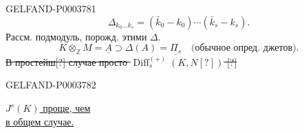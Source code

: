 \begin{GelfandAdjacentEvidence}{GELFAND-P000378}{1}
\begin{equation*}\Delta_{k_0\ldots k_s}=(\bar k_0-k_0)\cdots(\bar k_s-k_s).\end{equation*}
Рассм. подмодуль, порожд. этими $\Delta$.
\begin{equation*}K\otimes_{\mathbb Z}M=\underline A\supset\Delta(A)=\underline{\Pi_s}\quad\text{(обычное опред. джетов).}\end{equation*}
\sout{В простейш[?] случае просто $\operatorname{Diff}_s^{(+)}(K,N[?])$ [?]}
\end{GelfandAdjacentEvidence}
\begin{GelfandAdjacentEvidence}{GELFAND-P000378}{2}

\end{GelfandAdjacentEvidence}

\begin{flushright}\underline{$J^s(K)$ проще, чем}\\\underline{в общем случае.}\end{flushright}



